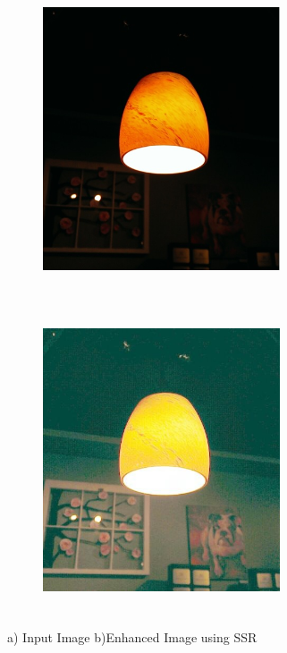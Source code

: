 \begin{figure}
	\begin{subfigure}{8cm}
		\centering    
    	\includegraphics[width=7cm,height=9cm,keepaspectratio]{images/ch5/bulb_input.jpg}
    	\caption{} 
    \end{subfigure}
  	\begin{subfigure}{6cm}
  		\centering
  		\includegraphics[width=7cm,height=9cm,keepaspectratio]{images/ch5/bulb_msr.jpg}
   		\caption{}
  	\end{subfigure}
  	\caption{a) Input Image b)Enhanced Image using SSR}
  	\label{fig:msr}
\end{figure}
